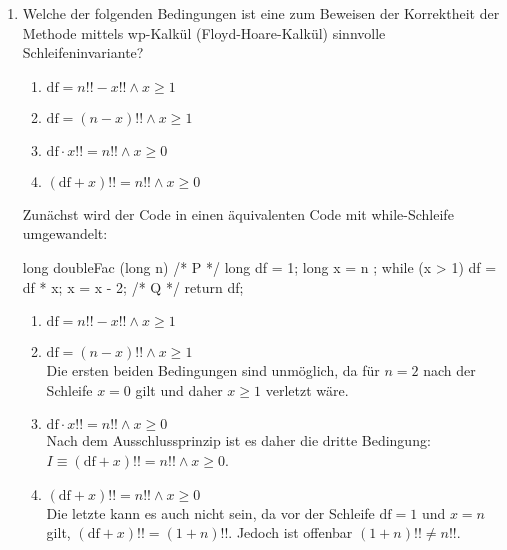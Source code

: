 \documentclass{bschlangaul-aufgabe}
\begin{document}
\begin{enumerate}


\item Welche der folgenden Bedingungen ist eine zum Beweisen der
Korrektheit der Methode mittels wp-Kalkül (Floyd-Hoare-Kalkül) sinnvolle
Schleifeninvariante?

\begin{enumerate}
\item $\text{df} = n!! - x!! \land x \geq 1$
\item $\text{df} = (n - x)!! \land x \geq 1$
\item $\text{df} \cdot x!! = n!! \land x \geq 0$
\item $(\text{df} + x)!! = n!! \land x \geq 0$
\end{enumerate}

\begin{liAntwort}
Zunächst wird der Code in einen äquivalenten Code mit while-Schleife
umgewandelt:

\begin{liJavaAngabe}
long doubleFac (long n) {
  /* P */ long df = 1;
  long x = n ;
  while (x > 1) {
    df = df * x;
    x = x - 2;
  } /* Q */
  return df;
}
\end{liJavaAngabe}

\begin{enumerate}
\item $\text{df} = n!! - x!! \land x \geq 1$
\item $\text{df} = (n - x)!! \land x \geq 1$ \\

Die ersten beiden Bedingungen sind unmöglich, da \zB für $n = 2$ nach
der Schleife $x = 0$ gilt und daher $x \geq 1$ verletzt wäre.

\item $\text{df} \cdot x!! = n!! \land x \geq 0$ \\

Nach dem Ausschlussprinzip ist es daher die dritte Bedingung: $I \equiv
(\text{df} + x)!! = n!! \land x \geq 0$.

\item $(\text{df} + x)!! = n!! \land x \geq 0$ \\

Die letzte kann es auch nicht sein, da vor der Schleife $\text{df} = 1$
und $x = n$ gilt, \dh $(\text{df} + x)!! = (1 + n)!!$. Jedoch ist
offenbar $(1 + n)!! \not = n!!$.
\end{enumerate}


\end{liAntwort}
\end{enumerate}
\end{document}
